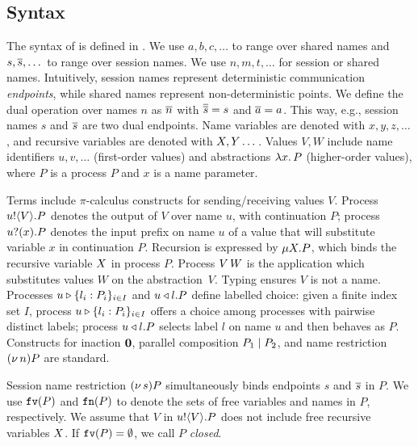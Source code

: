 \subsection{Syntax} 
The syntax of \HOp is defined in .
We use $a,b,c, \dots$ 
to range over shared names
and $s, \overline{s}, \dots$
to range over 
session names. 
We use $n, m, t, \dots$ for session or shared names. 
Intuitively, session names
represent deterministic communication \emph{endpoints}, 
 while shared names represent non-deterministic points. 
We define the dual operation over names $n$ as $\overline{n}$ with
$\overline{\overline{s}} = s$ and $\overline{a} = a$.
This way, e.g., session names $s$ and $\overline{s}$ are two dual endpoints.
Name variables are denoted with $x, y, z, \dots$, 
and recursive variables are denoted with $X, Y \dots$.
Values $V,W$ include 
name identifiers $u, v, \ldots$ (first-order values) 
and 
abstractions $\lambda x.\,P$ (higher-order values),
where $P$ is a process $P$ and $x$ is a name parameter.

 

{Terms} 
include $\pi$-calculus constructs for sending/receiving values $V$.
Process $u ! \langle V \rangle . P$ denotes the output of   $V$
over name $u$, with continuation $P$;
process $u ? (x) . P$ denotes the input prefix on name $u$ of a value
that 
will substitute variable $x$ in continuation $P$. 
Recursion is expressed by $\mu X. P$,
which binds the recursive variable $X$ in process $P$.
Process 
$V\, {W}$ 
is the application
which substitutes values $W$ on the abstraction~$V$. 
Typing  ensures  $V$ is not a name.
Processes $u \triangleright \{l_i: P_i\}_{i \in I}$  and $u \triangleleft l . P$ define labelled choice:
given a finite index set $I$, process $u \triangleright \{l_i: P_i\}_{i \in I}$ offers a choice 
among processes with pairwise distinct labels;
 process $u \triangleleft l . P$ selects label $l$ on name $u$ and then behaves as $P$.
Constructs for 
inaction $\mathbf{0}$,  parallel composition $P_1 \;|\; P_2$, and 
name restriction $(\nu\, n) P$ are standard.

Session name restriction $(\nu\, s) P$ simultaneously binds endpoints $s$ and $\overline{s}$ in $P$.
We use $\mathtt{fv}(P)$ and $\mathtt{fn}(P)$ to denote the sets of free 
variables and names in $P$, respectively.
We assume that $V$ in $u ! \langle V \rangle .{P}$ does not include free recursive 
variables $X$. 
If $\mathtt{fv}(P) = \emptyset$, we call $P$ {\em closed}.

